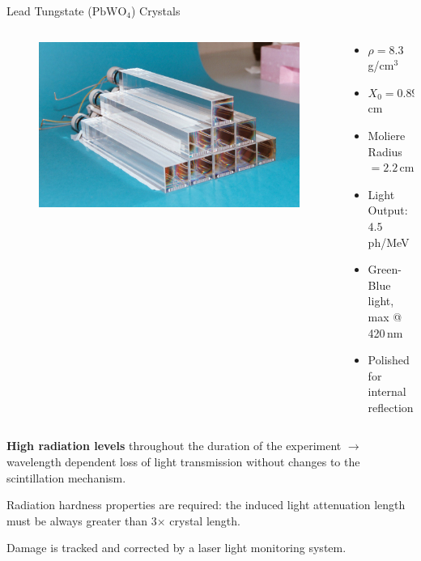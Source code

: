 \documentclass[10pt]{beamer}
\begin{document}
\begin{frame}{Lead Tungstate ($\text{PbWO}_4$) Crystals}
    \begin{columns}
        \begin{column}[l]{0.40\textwidth}
            \begin{figure}
                \includegraphics[width=\textwidth]{./img/crystals.jpg}
            \end{figure}    
            \end{column}
        \begin{column}[l]{0.55\textwidth}
        
        \begin{itemize}
                \item $\rho = 8.3\,$g/cm$^3$
                \item $X_0 = 0.89\,$cm
                \item Moliere Radius $ = 2.2$\,cm
                \item Light Output: $4.5$ ph/MeV
                \item Green-Blue light, max @ 420\,nm
                \item Polished for internal reflection
            \end{itemize}
        \end{column}
    \end{columns}
    \bigskip
    \textbf{High radiation levels} throughout the duration of the experiment $\rightarrow$ wavelength dependent loss of light transmission without changes to the scintillation mechanism.
    
    Radiation hardness properties are required: the induced light attenuation length must be always greater than 3$\times$ crystal length. 
    
    Damage is tracked and corrected by a laser light monitoring system.
 
\end{frame}
\end{document}
